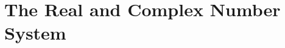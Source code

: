 \documentclass[../../templates/chapter]{subfiles}
\begin{document}
\chapter{The Real and Complex Number System}\label{chap:01-the-real-and-complex-number-system}
















\end{document}
